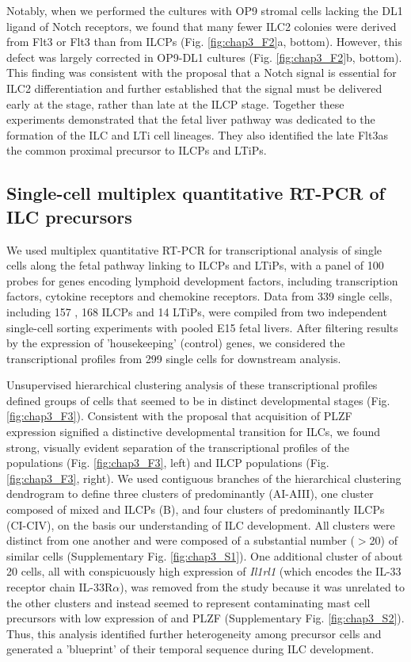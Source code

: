 Notably, when we performed the cultures with OP9 stromal cells lacking the DL1 ligand of Notch receptors, we found that many fewer ILC2 colonies were derived from Flt3\UP{} \aLPs or Flt3\UM{} \aLPs than from ILCPs (Fig. \ref{fig:chap3_F2}a, bottom). However, this defect was largely corrected in OP9-DL1 cultures (Fig. \ref{fig:chap3_F2}b, bottom). This finding was consistent with the proposal that a Notch signal is essential for ILC2 differentiation \cite{yang2013,wong2012} and further established that the signal must be delivered early at the \aLP stage, rather than late at the ILCP stage. Together these experiments demonstrated that the fetal liver \aLP pathway was dedicated to the formation of the ILC and LTi cell lineages. They also identified the late Flt3\UM \aLP as the common proximal precursor to ILCPs and LTiPs.

\subsection{Single-cell multiplex quantitative RT-PCR of ILC precursors}

We used multiplex quantitative RT-PCR for transcriptional analysis of single cells along the fetal pathway linking \aLPs to ILCPs and LTiPs, with a panel of 100 probes for genes encoding lymphoid development factors, including transcription factors, cytokine receptors and chemokine receptors. Data from 339 single cells, including 157 \aLPs, 168 ILCPs and 14 LTiPs, were compiled from two independent single-cell sorting experiments with pooled E15 fetal livers. After filtering results by the expression of 'housekeeping' (control) genes, we considered the transcriptional profiles from 299 single cells for downstream analysis.

Unsupervised hierarchical clustering analysis of these transcriptional profiles defined groups of cells that seemed to be in distinct developmental stages (Fig. \ref{fig:chap3_F3}). Consistent with the proposal that acquisition of PLZF expression signified a distinctive developmental transition for ILCs, we found strong, visually evident separation of the transcriptional profiles of the \aLP populations (Fig. \ref{fig:chap3_F3}, left) and ILCP populations (Fig. \ref{fig:chap3_F3}, right). We used contiguous branches of the hierarchical clustering dendrogram to define three clusters of predominantly \aLPs (AI-AIII), one cluster composed of mixed \aLPs and ILCPs (B), and four clusters of predominantly ILCPs (CI-CIV), on the basis our understanding of ILC development. All clusters were distinct from one another and were composed of a substantial number ($>$20) of similar cells (Supplementary Fig. \ref{fig:chap3_S1}). One additional cluster of about 20 cells, all with conspicuously high expression of \textit{Il1rl1} (which encodes the IL-33 receptor chain IL-33R$\alpha$), was removed from the study because it was unrelated to the other clusters and instead seemed to represent contaminating mast cell precursors with low expression of \ab and PLZF (Supplementary Fig. \ref{fig:chap3_S2}). Thus, this analysis identified further heterogeneity among precursor cells and generated a 'blueprint' of their temporal sequence during ILC development.

